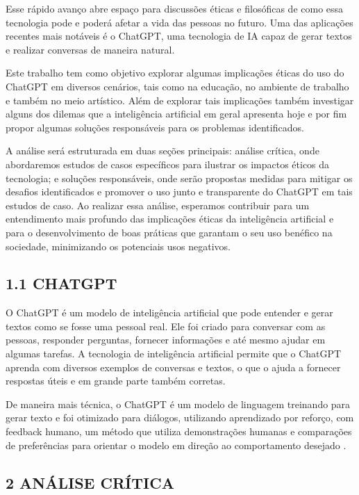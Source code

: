 Esse rápido avanço abre espaço para discussões éticas e filosóficas de como essa tecnologia pode e poderá afetar a vida das pessoas no futuro. Uma das aplicações recentes mais notáveis é o ChatGPT, uma tecnologia de IA capaz de gerar textos e realizar conversas de maneira natural. 

Este trabalho tem como objetivo explorar algumas implicações éticas do uso do ChatGPT em diversos cenários, tais como na educação, no ambiente de trabalho e também no meio artístico. Além de explorar tais implicações também investigar alguns dos dilemas que a inteligência artificial em geral apresenta hoje e por fim propor algumas soluções responsáveis para os problemas identificados.

A análise será estruturada em duas seções principais: análise crítica, onde abordaremos estudos de casos específicos para ilustrar os impactos éticos da tecnologia; e soluções responsáveis, onde serão propostas medidas para mitigar os desafios identificados e promover o uso junto e transparente do ChatGPT em tais estudos de caso. Ao realizar essa análise, esperamos contribuir para um entendimento mais profundo das implicações éticas da inteligência artificial e para o desenvolvimento de boas práticas que garantam o seu uso benéfico na sociedade, minimizando os potenciais usos negativos.

\subsection*{{1.1 CHATGPT}}
O ChatGPT é um modelo de inteligência artificial que pode entender e gerar textos como se fosse uma pessoal real. Ele foi criado para conversar com as pessoas, responder perguntas, fornecer informações e até mesmo ajudar em algumas tarefas. A tecnologia de inteligência artificial permite que o ChatGPT aprenda com diversos exemplos de conversas e textos, o que o ajuda a fornecer respostas úteis e em grande parte também corretas.

De maneira mais técnica, o ChatGPT é um modelo de linguagem treinando para gerar texto e foi otimizado para diálogos, utilizando aprendizado por reforço, com feedback humano, um método que utiliza demonstrações humanas e comparações de preferências para orientar o modelo em direção ao comportamento desejado \cite{OpenAI}.



\subsection*{\textbf{2 ANÁLISE CRÍTICA}}
